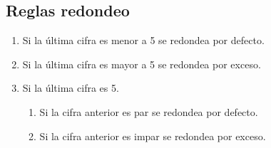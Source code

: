 \subsection{Reglas redondeo}
\begin{enumerate}
	\item Si la última cifra es menor a 5 se redondea por defecto.

	\item Si la última cifra es mayor a 5 se redondea por exceso.
	
	
	\item Si la última cifra es 5.
	\begin{enumerate}
			\item Si la cifra anterior es par se redondea por defecto.
			\item Si la cifra anterior es impar se redondea por exceso.
	\end{enumerate}
\end{enumerate}
